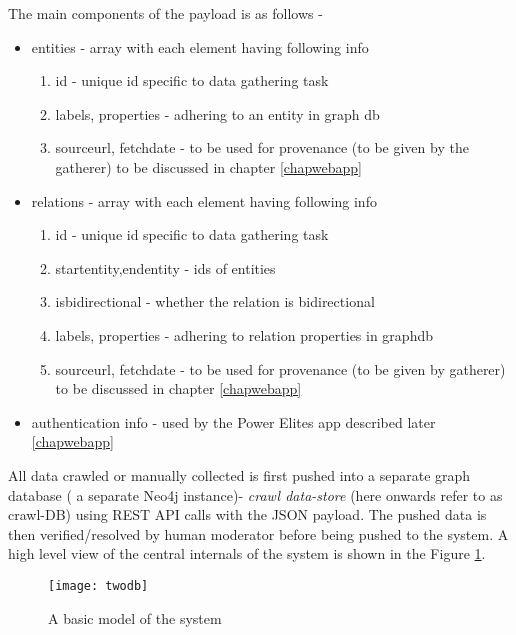 The main components of the payload is as follows -
\begin{itemize}
    \item entities - array with each element having following info
        \begin{enumerate}
            \item id - unique id specific to data gathering task
            \item labels, properties - adhering to an entity in graph db
            \item sourceurl, fetchdate - to be used for provenance (to be given by the gatherer) to be discussed in chapter \ref{chapwebapp}
        \end{enumerate}
    \item relations - array with each element having following info
        \begin{enumerate}
            \item id - unique id specific to data gathering task
            \item startentity,endentity - ids of entities
            \item isbidirectional - whether the relation is bidirectional 
            \item labels, properties - adhering to relation properties in graphdb
            \item sourceurl, fetchdate - to be used for provenance (to be given by gatherer) to be discussed in chapter \ref{chapwebapp}
        \end{enumerate}
    \item authentication info - used by the Power Elites app described later \ref{chapwebapp}
\end{itemize}

All data crawled or manually collected is first pushed into a separate graph database ( a separate Neo4j instance)-  \emph{crawl data-store} (here onwards refer to as crawl-DB) using REST API calls with the JSON payload. The pushed data is then verified/resolved by human moderator before being pushed to the system. A high level view of the central internals of the system is shown in the Figure \ref{fig:twodb}.

\begin{figure}[H]
\begin{center}  
\texttt{[image: twodb]} 
\caption{A basic model of the system}
\label{fig:twodb}
\end{center}
\end{figure}

